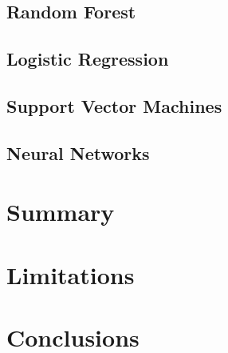\documentclass[a4paper, oneside, 11pt]{article}
\begin{document}
\subsection{Random Forest}
\subsection{Logistic Regression}
\subsection{Support Vector Machines}
\subsection{Neural Networks}
\section{Summary}

\section{Limitations}

\section{Conclusions}

\newpage


\newpage
\appendix
\end{document}
